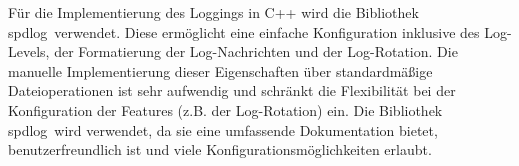 Für die Implementierung des Loggings in C++ wird die Bibliothek \glqq spdlog\grqq\ verwendet. Diese ermöglicht eine einfache Konfiguration inklusive des Log-Levels, 
der Formatierung der Log-Nachrichten und der Log-Rotation. Die manuelle Implementierung dieser Eigenschaften über standardmäßige Dateioperationen ist sehr aufwendig und schränkt 
die Flexibilität bei der Konfiguration der Features (z.B. der Log-Rotation) ein. Die Bibliothek \glqq spdlog\grqq\ wird verwendet, da sie eine umfassende Dokumentation 
bietet, benutzerfreundlich ist und viele Konfigurationsmöglichkeiten erlaubt.